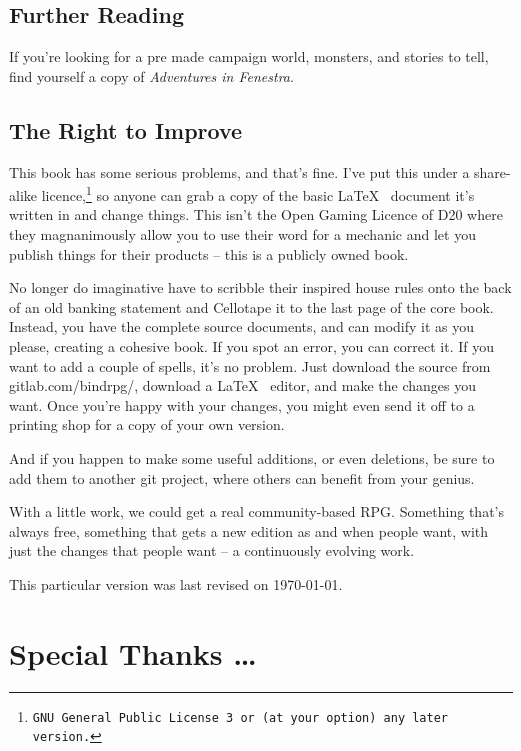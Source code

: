 \begin{multicols}{2}
\subsection*{Further Reading}

If you're looking for a pre made campaign world, monsters, and stories to tell, find yourself a copy of \textit{Adventures in Fenestra}.

\subsection*{The Right to Improve}

\noindent
This book has some serious problems, and that's fine.  I've put this under a share-alike licence,\footnote{\tt GNU General Public License 3 or (at your option) any later version.} so anyone can grab a copy of the basic \LaTeX~ document it's written in and change things.  This isn't the Open Gaming Licence of D20 where they magnanimously allow you to use their word for a mechanic and let you publish things for their products -- this is a publicly owned book.

No longer do imaginative  have to scribble their inspired house rules onto the back of an old banking statement and Cellotape it to the last page of the core book.
Instead, you have the complete source documents, and can modify it as you please, creating a cohesive book.
If you spot an error, you can correct it.
If you want to add a couple of spells, it's no problem.
Just download the source from gitlab.com/bindrpg/, download a \LaTeX~ editor, and make the changes you want.
Once you're happy with your changes, you might even send it off to a printing shop for a copy of your own version.

And if you happen to make some useful additions, or even deletions, be sure to add them to another git project, where others can benefit from your genius.

With a little work, we could get a real community-based RPG.
Something that's always free, something that gets a new edition as and when people want, with just the changes that people want -- a continuously evolving work.

This particular version was last revised on \today.

\end{multicols}

\section*{Special Thanks \ldots}

